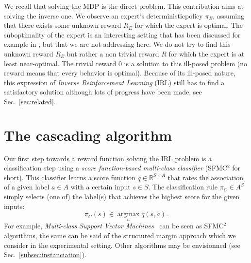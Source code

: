\documentclass[smallextended]{svjour3}
\newcommand{\argmax}{\operatorname*{argmax}} %
\begin{document}
We recall that solving the MDP is the direct problem. This contribution aims at solving the inverse one. We observe an expert's deterministic\footnotemark[\value{footnote}] policy $\pi_E$, assuming that there exists some unknown reward $R_E$ for which the expert is optimal. The suboptimality of the expert is an interesting setting that has been discussed for example in \cite{melo2010analysis,syed2010reduction}, but that we are not addressing here. We do not try to find this unknown reward $R_E$ but rather a non trivial reward $R$ for which the expert is at least near-optimal. The trivial reward $0$ is a solution to this ill-posed problem (no reward means that every behavior is optimal). Because of its ill-posed nature, this expression of \emph{Inverse Reinforcement Learning} (IRL) still has to find a satisfactory solution although lots of progress have been made, see Sec.~\ref{sec:related}.
\section{The cascading algorithm}
\label{sec:algo}
Our first step towards a reward function solving the IRL problem is a classification step using a \emph{score function-based multi-class classifier} (SFMC$^2$ for short). This classifier learns a score function $q\in\mathbb{R}^{S\times A}$ that rates the association of a given label $a\in A$ with a certain input $s\in S$. The classification rule $\pi_C\in A^S$ simply selects (one of) the label(s) that achieves the highest score for the given inputs:
\begin{equation}
  \label{eq:greedy2}
\pi_C(s) \in \argmax_a q(s,a).
\end{equation}
For example, \emph{Multi-class Support Vector Machines}~\cite{guermeur2011generic} can be seen as SFMC$^2$ algorithms, the same can be said of the structured margin approach \cite{taskar2005learning} which we consider in the experimental setting. Other algorithms may be envisionned (see Sec.~\ref{subsec:instanciation}). 
\end{document}
